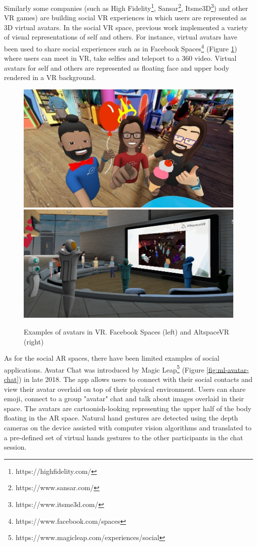 Similarly some companies (such as High Fidelity\footnote{https://highfidelity.com/}, Sansar\footnote{https://www.sansar.com/}, Itsme3D\footnote{https://www.itsme3d.com/}) and other VR games) are building social VR experiences in which users are represented as 3D virtual avatars. In the social VR space, previous work implemented a variety of visual representations of self and others. For instance, virtual avatars have been used to share social experiences such as in Facebook Spaces\footnote{https://www.facebook.com/spaces} (Figure \ref{fig:facebook-spaces}) where users can meet in VR, take selfies and teleport to a 360 video. Virtual avatars for self and others are represented as floating face and upper body rendered in a VR background. 

\begin{figure}
    \centering
    \includegraphics[width=.4\linewidth]{images/facebook-spaces.jpg}
    \includegraphics[width=.4\linewidth]{images/altspace-vr.png}
    \caption{Examples of avatars in VR. Facebook Spaces (left) and AltspaceVR (right)}
    \label{fig:facebook-spaces}
\end{figure}

As for the social AR spaces, there have been limited examples of social applications. Avatar Chat was introduced by Magic Leap\footnote{https://www.magicleap.com/experiences/social} (Figure \ref{fig:ml-avatar-chat}) in late 2018. The app allows users to connect with their social contacts and view their avatar overlaid on top of their physical environment. Users can share emoji, connect to a group "avatar" chat and talk about images overlaid in their space. The avatars are cartoonish-looking representing the upper half of the body floating in the AR space. Natural hand gestures are detected using the depth cameras on the device assisted with computer vision algorithms and translated to a pre-defined set of virtual hands gestures to the other participants in the chat session. 

